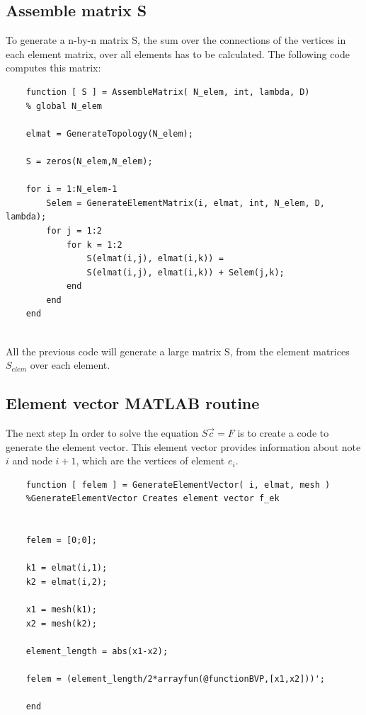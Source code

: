 \documentclass[a4paper]{report}
\begin{document}
\bigskip




\subsection{Assemble matrix S}
To generate a n-by-n matrix S, the sum over the connections of the vertices in each element matrix, over all elements has to be calculated. The following code computes this matrix:

\begin{lstlisting}
	function [ S ] = AssembleMatrix( N_elem, int, lambda, D)
	% global N_elem 
	
	elmat = GenerateTopology(N_elem);
	
	S = zeros(N_elem,N_elem);
	
	for i = 1:N_elem-1
		Selem = GenerateElementMatrix(i, elmat, int, N_elem, D, lambda);
		for j = 1:2
			for k = 1:2
				S(elmat(i,j), elmat(i,k)) =
				S(elmat(i,j), elmat(i,k)) +	Selem(j,k);
			end
		end
	end


\end{lstlisting}



All the previous code will generate a large matrix S, from the element matrices $S_{elem}$ over each element.\\



\subsection{Element vector MATLAB routine}

The next step In order to solve the equation $S\vec{c}=F$ is to create a code to generate the element vector. This element vector provides information about note $i$ and node $i+1$, which are the vertices of element $e_i$.\\



\begin{lstlisting}
	function [ felem ] = GenerateElementVector( i, elmat, mesh )
	%GenerateElementVector Creates element vector f_ek
	
	
	felem = [0;0];
	
	k1 = elmat(i,1);
	k2 = elmat(i,2);
	
	x1 = mesh(k1);
	x2 = mesh(k2);
	
	element_length = abs(x1-x2);
	
	felem = (element_length/2*arrayfun(@functionBVP,[x1,x2]))';
	
	end
\end{lstlisting}
\end{document}
